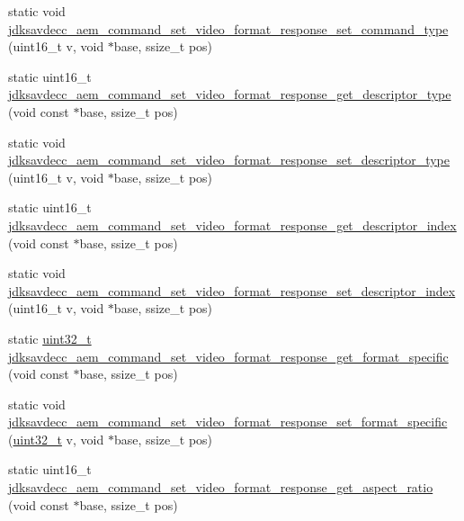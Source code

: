 \begin{DoxyCompactItemize}
static void \hyperlink{group__command__set__video__format__response_ga9a7a8a7ca82dcd7cc64d4886961cc372}{jdksavdecc\+\_\+aem\+\_\+command\+\_\+set\+\_\+video\+\_\+format\+\_\+response\+\_\+set\+\_\+command\+\_\+type} (uint16\+\_\+t v, void $\ast$base, ssize\+\_\+t pos)
\item 
static uint16\+\_\+t \hyperlink{group__command__set__video__format__response_ga9ec3adb27f62132acb8e0f47caf819fc}{jdksavdecc\+\_\+aem\+\_\+command\+\_\+set\+\_\+video\+\_\+format\+\_\+response\+\_\+get\+\_\+descriptor\+\_\+type} (void const $\ast$base, ssize\+\_\+t pos)
\item 
static void \hyperlink{group__command__set__video__format__response_gac57a7bd13d81d89cc86e8948e88af4bc}{jdksavdecc\+\_\+aem\+\_\+command\+\_\+set\+\_\+video\+\_\+format\+\_\+response\+\_\+set\+\_\+descriptor\+\_\+type} (uint16\+\_\+t v, void $\ast$base, ssize\+\_\+t pos)
\item 
static uint16\+\_\+t \hyperlink{group__command__set__video__format__response_gad21b9963ad9aec5db31d403a172be007}{jdksavdecc\+\_\+aem\+\_\+command\+\_\+set\+\_\+video\+\_\+format\+\_\+response\+\_\+get\+\_\+descriptor\+\_\+index} (void const $\ast$base, ssize\+\_\+t pos)
\item 
static void \hyperlink{group__command__set__video__format__response_ga273c06e048923a85b89e8588b970c1af}{jdksavdecc\+\_\+aem\+\_\+command\+\_\+set\+\_\+video\+\_\+format\+\_\+response\+\_\+set\+\_\+descriptor\+\_\+index} (uint16\+\_\+t v, void $\ast$base, ssize\+\_\+t pos)
\item 
static \hyperlink{parse_8c_a6eb1e68cc391dd753bc8ce896dbb8315}{uint32\+\_\+t} \hyperlink{group__command__set__video__format__response_gabb8dac5eaaecaf802a7ba404512629fb}{jdksavdecc\+\_\+aem\+\_\+command\+\_\+set\+\_\+video\+\_\+format\+\_\+response\+\_\+get\+\_\+format\+\_\+specific} (void const $\ast$base, ssize\+\_\+t pos)
\item 
static void \hyperlink{group__command__set__video__format__response_ga45dad7de7ba202c2ba315fc77cfaae32}{jdksavdecc\+\_\+aem\+\_\+command\+\_\+set\+\_\+video\+\_\+format\+\_\+response\+\_\+set\+\_\+format\+\_\+specific} (\hyperlink{parse_8c_a6eb1e68cc391dd753bc8ce896dbb8315}{uint32\+\_\+t} v, void $\ast$base, ssize\+\_\+t pos)
\item 
static uint16\+\_\+t \hyperlink{group__command__set__video__format__response_gaebc0d053b3ad2b15b2e2f6910591acbe}{jdksavdecc\+\_\+aem\+\_\+command\+\_\+set\+\_\+video\+\_\+format\+\_\+response\+\_\+get\+\_\+aspect\+\_\+ratio} (void const $\ast$base, ssize\+\_\+t pos)

\end{DoxyCompactItemize}
